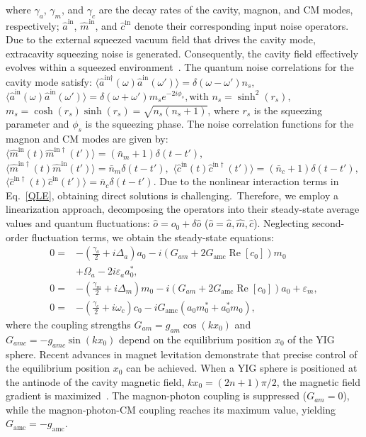 \documentclass[aps, prresearch, reprint, nofootinbib, longbibliography]{revtex4-2}
\begin{document}
where \( \gamma_a \), \( \gamma_m \), and \( \gamma_c \) are the decay rates of the cavity, magnon, and CM modes, respectively; \( \hat{a}^{\text{in}} \), \( \hat{m}^{\text{in}} \), and \( \hat{c}^{\text{in}} \) denote their corresponding input noise operators.
Due to the external squeezed vacuum field that drives the cavity mode, extracavity squeezing noise is generated. Consequently, the cavity field effectively evolves within a squeezed environment~\cite{PhysRevA.94.051801,PhysRevA.110.063520}. The quantum noise correlations for the cavity mode satisfy:
$
\langle \hat{a}^{\text{in}\dagger}(\omega) \hat{a}^{\text{in}}(\omega') \rangle = \delta(\omega - \omega') n_s, $
$	\langle \hat{a}^{\text{in}}(\omega) \hat{a}^{\text{in}}(\omega') \rangle = \delta(\omega + \omega') m_s e^{-2i\phi_s},
$with \( n_s = \sinh^2(r_s) \), \( m_s = \cosh(r_s)\sinh(r_s) = \sqrt{n_s(n_s+1)} \), where \( r_s \) is the squeezing parameter and \( \phi_s \) is the squeezing phase. The noise correlation functions for the magnon and CM modes are given by:
$
\langle \hat{m}^{\mathrm{in}}(t) \hat{m}^{\mathrm{in}\dagger}(t') \rangle = (\bar{n}_m + 1) \delta(t - t'), $$ \langle \hat{m}^{\mathrm{in}\dagger}(t) \hat{m}^{\mathrm{in}}(t') \rangle = \bar{n}_m \delta(t - t'),$
$	\langle \hat{c}^{\mathrm{in}}(t) \hat{c}^{\mathrm{in}\dagger}(t') \rangle = (\bar{n}_c + 1) \delta(t - t'), $$\langle \hat{c}^{\mathrm{in}\dagger}(t) \hat{c}^{\mathrm{in}}(t') \rangle = \bar{n}_c \delta(t - t').
$
Due to the nonlinear interaction terms in Eq.~\eqref{QLE}, obtaining direct solutions is challenging.~Therefore, we employ a linearization approach, decomposing the operators into their steady-state average values and quantum fluctuations: \( \hat{o} = o_0 + \delta\hat{o} \) (\( \hat{o} = \hat{a}, \hat{m}, \hat{c} \)). Neglecting second-order fluctuation terms, we obtain the steady-state equations:
\begin{align}
	0 = &-\left( \frac{\gamma_a}{2} + i\Delta_a \right)a_0 - i\left( G_{am} + 2G_{\mathrm{amc}} \operatorname{Re}[c_0] \right)m_0 \nonumber \\
	& + \Omega_a - 2i\varepsilon_a a_0^*, \nonumber\\
	0 = &-\left( \frac{\gamma_m}{2} + i\Delta_m \right)m_0 - i\left( G_{am} + 2G_{\mathrm{amc}} \operatorname{Re}[c_0] \right)a_0 + \varepsilon_m, \nonumber \\
	0 = &-\left( \frac{\gamma_c}{2} + i\omega_c \right)c_0 - iG_{\mathrm{amc}} \left( a_0 m_0^* + a_0^* m_0 \right),
	\label{eq:steady_state}
\end{align}
where the coupling strengths \( G_{am} = g_{am}\cos(kx_0) \) and \( G_{amc} = -g_{amc}\sin(kx_0) \) depend on the equilibrium position \( x_0 \) of the YIG sphere. Recent advances in magnet levitation demonstrate that precise control of the equilibrium position \( x_0 \) can be achieved. When a YIG sphere is positioned at the antinode of the cavity magnetic field, \( k x_0 = (2n+1)\pi/2 \)\hspace{0.5em}, the magnetic field gradient is maximized~\cite{PhysRevLett.123.107702,PhysRevLett.113.156401,PhysRevLett113083603}. The magnon-photon coupling is suppressed (\( G_{am} = 0 \)), while the magnon-photon-CM coupling reaches its maximum value, yielding \( G_{\mathrm{amc}} = -g_{\mathrm{amc}} \).
\end{document}

